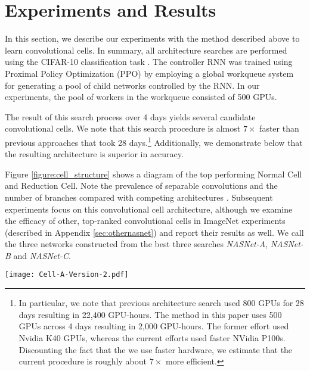 \documentclass[10pt,twocolumn,letterpaper]{article}
\begin{document}
\section{Experiments and Results}In this section, we describe our experiments with the method described above to learn convolutional cells. In summary, all architecture searches are performed using the CIFAR-10 classification task \cite{krizhevsky2009learning}. The controller RNN was trained using Proximal Policy Optimization (PPO) \cite{SchulmanWDRK17} by employing a global workqueue system for generating a pool of child networks controlled by the RNN. In our experiments, the pool of workers in the workqueue consisted of 500 GPUs. 

The result of this search process over 4 days yields several candidate convolutional cells. We note that this search procedure is almost $7\times$ faster than previous approaches \cite{zoph2017neural} that took 28 days.\footnote{In particular, we note that previous architecture search \cite{zoph2017neural} used 800 GPUs for 28 days resulting in 22,400 GPU-hours. The method in this paper uses 500 GPUs across 4 days resulting in 2,000 GPU-hours. The former effort used Nvidia K40 GPUs, whereas the current efforts used faster NVidia P100s. Discounting the fact that the we use faster hardware, we estimate that the current procedure is roughly about $7\times$ more efficient.} Additionally, we demonstrate below that the resulting architecture is superior in accuracy.

Figure \ref{figure:cell_structure} shows a diagram of the top performing Normal Cell and Reduction Cell. Note the prevalence of separable convolutions and the number of branches compared with competing architectures \cite{simonyan2014very,szegedy2015going,he2015deep,szegedy2016rethinking,szegedy2016inception}. Subsequent experiments focus on this convolutional cell architecture, although we examine the efficacy of other, top-ranked  convolutional cells in ImageNet experiments (described in Appendix \ref{sec:othernasnet}) and report their results as well. We call the three networks constructed from the best three searches \emph{NASNet-A}, \emph{NASNet-B} and \emph{NASNet-C}.

\begin{figure*}[h!]
\begin{center}
\texttt{[image: Cell-A-Version-2.pdf]}
\caption{Architecture of the best convolutional cells (NASNet-A) with $B=5$ blocks identified with CIFAR-10 . The input (white) is the hidden state from previous activations (or input image). The output (pink) is the result of a concatenation operation across all resulting branches.
Each convolutional cell is the result of $B$ blocks.
A single block is corresponds to two primitive operations (yellow) and a combination operation (green). Note that colors correspond to operations in Figure \ref{figure:cell}. 
}
\label{figure:cell_structure}
\end{center}
\end{figure*}
\end{document}
